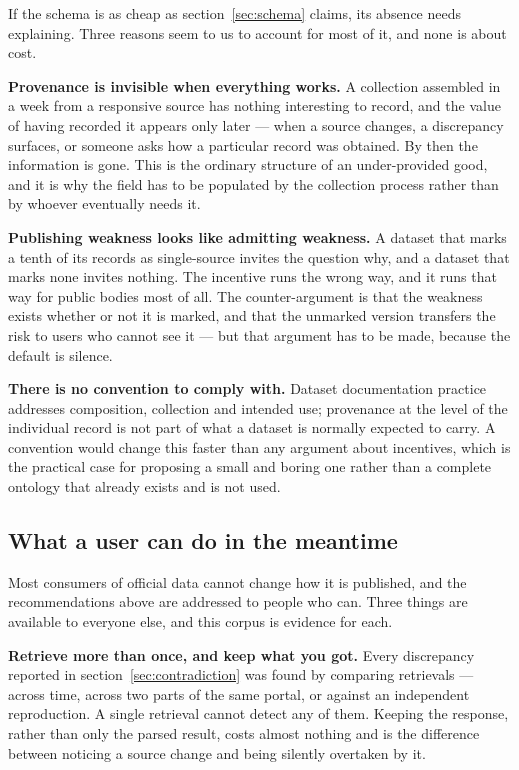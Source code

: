 \documentclass[11pt]{article}
\begin{document}
If the schema is as cheap as section~\ref{sec:schema} claims, its absence needs
explaining. Three reasons seem to us to account for most of it, and none is
about cost.

\textbf{Provenance is invisible when everything works.} A collection assembled
in a week from a responsive source has nothing interesting to record, and the
value of having recorded it appears only later --- when a source changes, a
discrepancy surfaces, or someone asks how a particular record was obtained. By
then the information is gone. This is the ordinary structure of an
under-provided good, and it is why the field has to be populated by the
collection process rather than by whoever eventually needs it.

\textbf{Publishing weakness looks like admitting weakness.} A dataset that
marks a tenth of its records as single-source invites the question why, and
a dataset that marks none invites nothing. The incentive runs the wrong way,
and it runs that way for public bodies most of all. The counter-argument is
that the weakness exists whether or not it is marked, and that the unmarked
version transfers the risk to users who cannot see it --- but that argument has
to be made, because the default is silence.

\textbf{There is no convention to comply with.} Dataset documentation practice
addresses composition, collection and intended use; provenance at the level of
the individual record is not part of what a dataset is normally expected to
carry. A convention would change this faster than any argument about incentives,
which is the practical case for proposing a small and boring one rather than a
complete ontology that already exists and is not used.

\subsection{What a user can do in the meantime}

Most consumers of official data cannot change how it is published, and the
recommendations above are addressed to people who can. Three things are
available to everyone else, and this corpus is evidence for each.

\textbf{Retrieve more than once, and keep what you got.} Every discrepancy
reported in section~\ref{sec:contradiction} was found by comparing retrievals
--- across time, across two parts of the same portal, or against an independent
reproduction. A single retrieval cannot detect any of them. Keeping the
response, rather than only the parsed result, costs almost nothing and is the
difference between noticing a source change and being silently overtaken by it.
\end{document}
